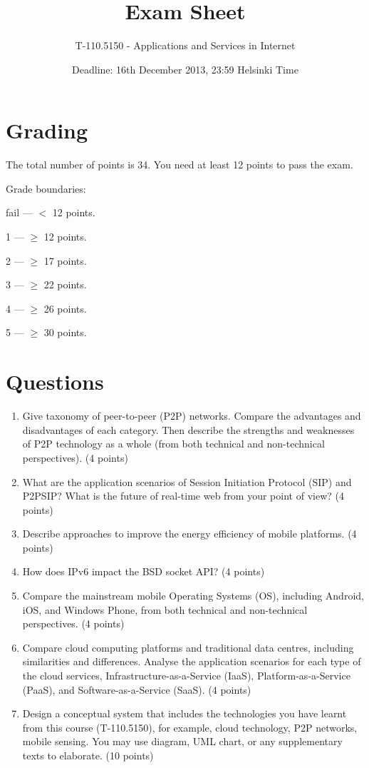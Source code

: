 \documentclass{article}
\title{\vspace{-10pt}Exam Sheet}
\author{T-110.5150 - Applications and Services in Internet}
\date{Deadline: 16th December 2013, 23:59 Helsinki Time}
\begin{document}
\maketitle

\section*{Grading}
\noindent
The total number of points is 34.
You need at least 12 points to pass the exam.

\noindent
Grade boundaries:
\vskip 10pt

fail --- $<$ 12 points.

1 --- $\ge$ 12 points.

2 --- $\ge$ 17 points.

3 --- $\ge$ 22 points.

4 --- $\ge$ 26 points.

5 --- $\ge$ 30 points.

\section*{Questions}

\begin{enumerate}

\item Give taxonomy of peer-to-peer (P2P) networks. Compare the advantages and disadvantages of each category. Then describe the strengths and weaknesses of P2P technology as a whole (from both technical and non-technical perspectives). (4 points)

\item What are the application scenarios of Session Initiation Protocol (SIP) and P2PSIP? What is the future of real-time web from your point of view? (4 points)

\item Describe approaches to improve the energy efficiency of mobile platforms. (4 points)

\item How does IPv6 impact the BSD socket API? (4 points)

\item Compare the mainstream mobile Operating Systems (OS), including Android, iOS, and Windows Phone, from both technical and non-technical perspectives. (4 points)

\item Compare cloud computing platforms and traditional data centres, including similarities and differences. Analyse the application scenarios for each type of the cloud services, Infrastructure-as-a-Service (IaaS), Platform-as-a-Service (PaaS), and Software-as-a-Service (SaaS). (4 points)

\item Design a conceptual system that includes the technologies you have learnt from this course (T-110.5150), for example, cloud technology, P2P networks, mobile sensing. You may use diagram, UML chart, or any supplementary texts to elaborate. (10 points)

\end{enumerate}
\end{document}
